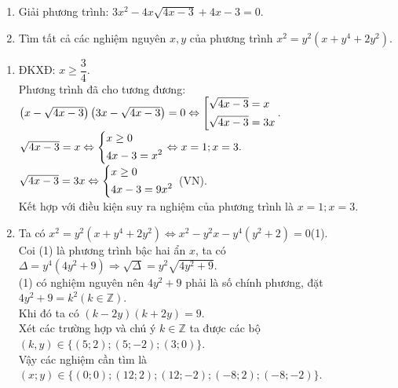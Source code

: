 \begin{ex}%
\hfill

\begin{enumerate}
	\item Giải phương trình: $3x^2-4x\sqrt{4x-3}+4x-3=0$.
	\item Tìm tất cả các nghiệm nguyên $x,y$ của phương trình $x^2=y^2(x+y^4+2y^2)$.
\end{enumerate}
\loigiai
   {\begin{enumerate}
   		\item ĐKXĐ: $x\geq \dfrac{3}{4}$.\\
   		Phương trình đã cho tương đương: $\left( x-\sqrt{4x-3}\right) \left(3x-\sqrt{4x-3} \right)=0\Leftrightarrow\left[\begin{aligned}&\sqrt{4x-3}=x\\&\sqrt{4x-3}=3x\end{aligned}\right. $.\\
   		$\sqrt{4x-3}=x\Leftrightarrow\left\{\begin{aligned}&x\geq 0\\&4x-3=x^2\end{aligned}\right.\Leftrightarrow x=1;x=3.$\\
   		$\sqrt{4x-3}=3x\Leftrightarrow\left\{\begin{aligned}&x\geq 0\\&4x-3=9x^2\end{aligned}\right.$ (VN).\\
   		Kết hợp với điều kiện suy ra nghiệm của phương trình là $x=1;x=3$.
   		\item Ta có $x^2=y^2\left( x+y^4+2y^2\right) \Leftrightarrow x^2-y^2x-y^4(y^2+2)=0$(1).\\
   		Coi (1) là phương trình bậc hai ẩn $x$, ta có $\Delta=y^4(4y^2+9)\Rightarrow\sqrt{\Delta}=y^2\sqrt{4y^2+9}.$\\
   		(1) có nghiệm nguyên nên $4y^2+9$ phải là số chính phương, đặt $4y^2+9=k^2(k\in\mathbb{Z})$. \\Khi đó  ta có $(k-2y)(k+2y)=9$.\\
   		Xét các trường hợp và chú ý $k\in\mathbb{Z}$ ta được các bộ $(k,y)\in\{(5;2);(5;-2);(3;0)\}$.\\
   		Vậy các nghiệm cần tìm là $(x;y)\in\{(0;0);(12;2);(12;-2);(-8;2);(-8;-2)\}$.  		 
   	\end{enumerate}
} 
\end{ex}
